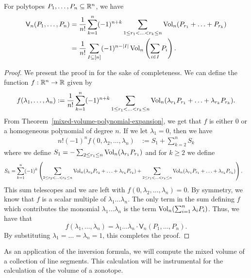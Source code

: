 \documentclass{puthesis-UG}
\begin{document}
\begin{thm} \label{inversion-formula}
	For polytopes $P_1, \ldots, P_n \subseteq \mathbb{R}^n$, we have
	\begin{align*}
		\mathsf{V}_n(P_1, \ldots, P_n) & = \frac{1}{n!} \sum_{k = 1}^n (-1)^{n+k} \sum_{1 \leq r_1 < \ldots < r_k \leq n} \operatorname{Vol}_n (P_{r_1} + \ldots + P_{r_k}) \\
		& = \frac{1}{n!} \sum_{I \subseteq [n]} (-1)^{n - |I|} \operatorname{Vol}_n \left ( \sum_{i \in I} P_i \right ).
	\end{align*}
\end{thm}

\begin{proof}
	We present the proof in \cite{schneider_2013} for the sake of completeness. We can define the function $f : \mathbb{R}^n \to \mathbb{R}$ given by 
	\[
		f(\lambda_1, \ldots, \lambda_n) := \frac{1}{n!} \sum_{k = 1}^n (-1)^{n+k} \sum_{1 \leq r_1 < \ldots < r_k \leq n} \operatorname{Vol}_n(\lambda_{r_1} P_{r_1} + \ldots+ \lambda_{r_k} P_{r_k}).
	\]
	From Theorem~\ref{mixed-volume-polynomial-expansion}, we get that $f$ is either $0$ or a homogeneous polynomial of degree $n$. If we let $\lambda_1 = 0$, then we have
	\begin{align*}
		n! (-1)^n f(0, \lambda_2, \ldots, \lambda_n) & := S_1 + \sum_{k = 2}^n S_k
	\end{align*}
	where we define $S_1 = - \sum_{2 \leq r_1 \leq n} \operatorname{Vol}_n (\lambda_{r_1} P_{r_1})$ and for $k \geq 2$ we define
	\begin{align*}
		S_k & = \sum_{k = 1}^n (-1)^k \left ( \sum_{2 \leq r_2 < \ldots < r_k \leq n} \operatorname{Vol}_n(\lambda_{r_2} P_{r_2} + \ldots + \lambda_{r_k} P_{r_k}) + \sum_{2 \leq r_1 < \ldots < r_k \leq n} \operatorname{Vol}_n (\lambda_{r_1} P_{r_1} + \ldots + \lambda_{r_k} P_{r_k})\right ).
	\end{align*}
	This sum telescopes and we are left with $f(0, \lambda_2, \ldots, \lambda_n) = 0$. By symmetry, we know that $f$ is a scalar multiple of $\lambda_1 \ldots \lambda_n$. The only term in the sum defining $f$ which contributes the monomial $\lambda_1 \ldots \lambda_n$ is the term $\operatorname{Vol}_n (\sum_{i = 1}^n \lambda_i P_i)$. Thus, we have that 
	\[
		f(\lambda_1, \ldots, \lambda_n) = \lambda_1 \ldots \lambda_n \cdot \mathsf{V}_n (P_1, \ldots, P_n).
	\]
	By substituting $\lambda_1 = \ldots = \lambda_n = 1$, this completes the proof. 
\end{proof}

As an application of the inversion formula, we will compute the mixed volume of a collection of line segments. This calculation will be instrumental for the calculation of the volume of a zonotope. 
\end{document}
